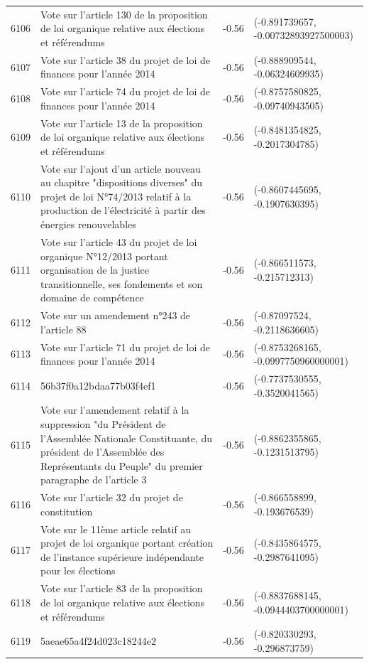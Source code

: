 \begin{table}[ht]
\begin{tabular}{rlrl}
  6106 & Vote sur l'article 130 de la proposition de loi organique relative aux élections et référendums & -0.56 & (-0.891739657, -0.00732893927500003) \\ 
  6107 & Vote sur l'article 38 du projet de loi de finances pour l'année 2014 & -0.56 & (-0.888909544, -0.06324609935) \\ 
  6108 & Vote sur l'article 74 du projet de loi de finances pour l'année 2014 & -0.56 & (-0.8757580825, -0.09740943505) \\ 
  6109 & Vote sur l'article 13 de la proposition de loi organique relative aux élections et référendums & -0.56 & (-0.8481354825, -0.2017304785) \\ 
  6110 & Vote sur l'ajout d'un article nouveau au chapitre "dispositions diverses" du projet de loi N°74/2013 relatif à la production de l'électricité à partir des énergies renouvelables & -0.56 & (-0.8607445695, -0.1907630395) \\ 
  6111 & Vote sur l'article 43 du projet de loi organique N°12/2013 portant organisation de la justice transitionnelle, ses fondements et son domaine de compétence & -0.56 & (-0.866511573, -0.215712313) \\ 
  6112 & Vote sur un amendement n°243 de l'article 88 & -0.56 & (-0.87097524, -0.2118636605) \\ 
  6113 & Vote sur l'article 71 du projet de loi de finances pour l'année 2014 & -0.56 & (-0.8753268165, -0.0997750960000001) \\ 
  6114 & 56b37f0a12bdaa77b03f4ef1 & -0.56 & (-0.7737530555, -0.3520041565) \\ 
  6115 & Vote sur l'amendement relatif à la suppression "du Président de l’Assemblée Nationale Constituante, du président de l’Assemblée des Représentants du Peuple" du premier paragraphe de l'article 3 & -0.56 & (-0.8862355865, -0.1231513795) \\ 
  6116 & Vote sur l'article 32 du projet de constitution & -0.56 & (-0.866558899, -0.193676539) \\ 
  6117 & Vote sur le 11ème article relatif au projet de loi organique portant création de l'instance supérieure indépendante pour les élections & -0.56 & (-0.8435864575, -0.2987641095) \\ 
  6118 & Vote sur l'article 83 de la proposition de loi organique relative aux élections et référendums & -0.56 & (-0.8837688145, -0.0944403700000001) \\ 
  6119 & 5aeae65a4f24d023c18244e2 & -0.56 & (-0.820330293, -0.296873759) \\ 

\end{tabular}
\end{table}

